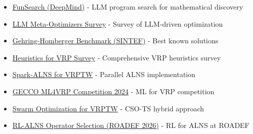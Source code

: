 \documentclass[twocolumn,10pt,letterpaper]{article}
\begin{document}
\begin{itemize}
  \item \href{https://www.nature.com/articles/s41586-023-06924-6}{FunSearch (DeepMind)} - LLM program search for mathematical discovery
  \item \href{https://link.springer.com/article/10.1007/s10462-025-11470-w}{LLM Meta-Optimizers Survey} - Survey of LLM-driven optimization
  \item \href{https://www.sintef.no/projectweb/top/vrptw/homberger-benchmark/400-customers/}{Gehring-Homberger Benchmark (SINTEF)} - Best known solutions
  \item \href{https://arxiv.org/abs/2303.04147}{Heuristics for VRP Survey} - Comprehensive VRP heuristics survey
  \item \href{https://www.nature.com/articles/s41598-024-74432-2}{Spark-ALNS for VRPTW} - Parallel ALNS implementation
  \item \href{https://github.com/ML4VRP/ML4VRP2024}{GECCO ML4VRP Competition 2024} - ML for VRP competition
  \item \href{http://www.aimspress.com/article/doi/10.3934/era.2026116}{Swarm Optimization for VRPTW} - CSO-TS hybrid approach
  \item \href{https://roadef2026.sciencesconf.org/685226/document}{RL-ALNS Operator Selection (ROADEF 2026)} - RL for ALNS at ROADEF
\end{itemize}


\balance
\end{document}
